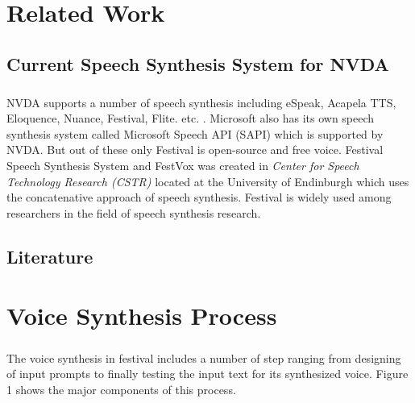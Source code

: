 \documentclass{report}
\begin{document}
	\chapter{Related Work}
		\section{Current Speech Synthesis System for NVDA}
			\paragraph{}
			NVDA supports a number of speech synthesis including eSpeak, Acapela TTS, Eloquence, Nuance, Festival, Flite. etc. \cite{NVDA:7}. Microsoft also has its own speech synthesis system called Microsoft Speech API (SAPI) which is supported by NVDA. But out of these only Festival is open-source and free voice. Festival Speech Synthesis System and FestVox was created in \textit{Center for Speech Technology Research (CSTR)} located at the University of Endinburgh which uses the concatenative approach of speech synthesis. Festival is widely used among researchers in the field of speech synthesis research. \cite{FESTVOICE:8}
		\section{Literature}
			\paragraph{}
	\chapter{Voice Synthesis Process}
		\paragraph{}
			The voice synthesis in festival includes a number of step ranging from designing of input prompts to finally testing the input text for its synthesized voice. Figure 1 shows the major components of this process.
\end{document}
